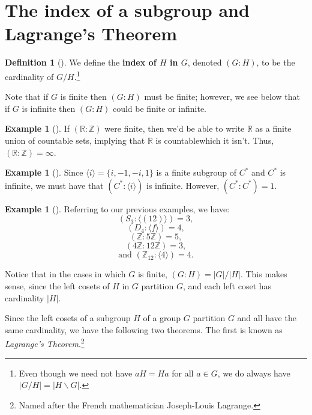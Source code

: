 \documentclass[10pt,]{book}
\newcommand{\terminology}[1]{\textbf{#1}}
\theoremstyle{plain}
\theoremstyle{definition}
\newtheorem{definition}[theorem]{Definition}
\theoremstyle{definition}
\theoremstyle{definition}
\newtheorem{example}[theorem]{Example}
\theoremstyle{definition}
\numberwithin{equation}{section}
\def\Z{\mathbb{Z}}
\def\R{\mathbb{R}}
\begin{document}
\section[{The index of a subgroup and Lagrange's Theorem}]{The index of a subgroup and Lagrange's Theorem}\label{section-24}
\begin{definition}[{}]\label{definition-61}
We define the \terminology{index of \(H\) in \(G\)}, denoted \((G:H)\), to be the cardinality of \(G/H\).\footnote{Even though we need not have \(aH=Ha\) for all \(a\in G\), we do always have \(|G/H|=|H\backslash G|\).\label{fn-7}}%
\end{definition}
Note that if \(G\) is finite then \((G:H)\) must be finite; however, we see below that if \(G\) is infinite then \((G:H)\) could be finite or infinite.%
\begin{example}[]\label{example-74}
If \((\R:\Z)\) were finite, then we'd be able to write \(\R\) as a finite union of countable sets, implying that \(\R\) is countable\textemdash{}which it isn't. Thus, \((\R:\Z)=\infty\).%
\end{example}
\begin{example}[]\label{example-75}
Since \(\langle i\rangle =\{i,-1,-i,1\}\) is a finite subgroup of \(C^*\) and \(C^*\) is infinite, we must have that \((C^*:\langle i\rangle )\) is infinite. However, \((C^*:C^*)=1\).%
\end{example}
\begin{example}[]\label{indices_ex}
Referring to our previous examples, we have: %
\begin{equation*}
(S_3:\langle (12)\rangle )=3,
\end{equation*}
%
\begin{equation*}
(D_4:\langle f\rangle )=4,
\end{equation*}
%
\begin{equation*}
(\Z:5\Z)=5,
\end{equation*}
%
\begin{equation*}
(4\Z:12\Z)=3,
\end{equation*}
%
\begin{equation*}
\text{and }(\Z_{12}:\langle 4\rangle )=4.
\end{equation*}
%
\end{example}
Notice that in the cases in which \(G\) is finite, \((G:H)=|G|/|H|\). This makes sense, since the left cosets of \(H\) in \(G\) partition \(G\), and each left coset has cardinality \(|H|\).%
\par
Since the left cosets of a subgroup \(H\) of a group \(G\) partition \(G\) and all have the same cardinality, we have the following two theorems. The first is known as \emph{Lagrange's Theorem}.\footnote{Named after the French mathematician Joseph-Louis Lagrange.\label{fn-8}}%
\end{document}
